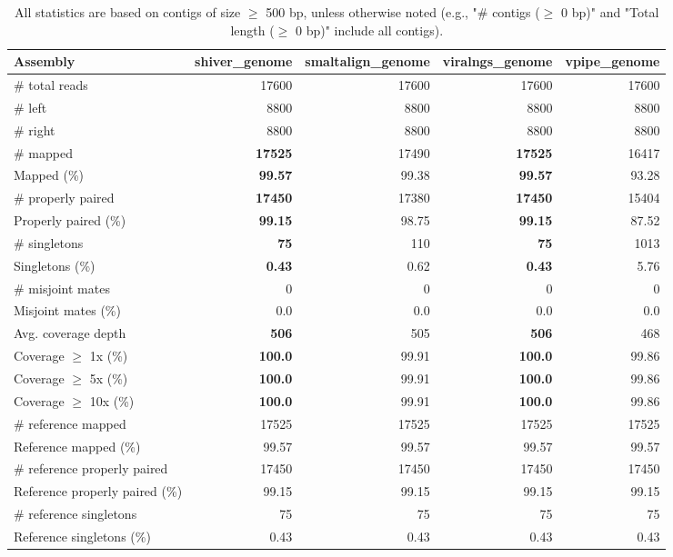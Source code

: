 \documentclass[12pt,a4paper]{article}
\begin{document}
\begin{table}[ht]
\begin{center}
\caption{All statistics are based on contigs of size $\geq$ 500 bp, unless otherwise noted (e.g., "\# contigs ($\geq$ 0 bp)" and "Total length ($\geq$ 0 bp)" include all contigs).}
\begin{tabular}{|l*{4}{|r}|}
\hline
Assembly & shiver\_genome & smaltalign\_genome & viralngs\_genome & vpipe\_genome \\ \hline
\# total reads & 17600 & 17600 & 17600 & 17600 \\ \hline
\# left & 8800 & 8800 & 8800 & 8800 \\ \hline
\# right & 8800 & 8800 & 8800 & 8800 \\ \hline
\# mapped & {\bf 17525} & 17490 & {\bf 17525} & 16417 \\ \hline
Mapped (\%) & {\bf 99.57} & 99.38 & {\bf 99.57} & 93.28 \\ \hline
\# properly paired & {\bf 17450} & 17380 & {\bf 17450} & 15404 \\ \hline
Properly paired (\%) & {\bf 99.15} & 98.75 & {\bf 99.15} & 87.52 \\ \hline
\# singletons & {\bf 75} & 110 & {\bf 75} & 1013 \\ \hline
Singletons (\%) & {\bf 0.43} & 0.62 & {\bf 0.43} & 5.76 \\ \hline
\# misjoint mates & 0 & 0 & 0 & 0 \\ \hline
Misjoint mates (\%) & 0.0 & 0.0 & 0.0 & 0.0 \\ \hline
Avg. coverage depth & {\bf 506} & 505 & {\bf 506} & 468 \\ \hline
Coverage $\geq$ 1x (\%) & {\bf 100.0} & 99.91 & {\bf 100.0} & 99.86 \\ \hline
Coverage $\geq$ 5x (\%) & {\bf 100.0} & 99.91 & {\bf 100.0} & 99.86 \\ \hline
Coverage $\geq$ 10x (\%) & {\bf 100.0} & 99.91 & {\bf 100.0} & 99.86 \\ \hline
\# reference mapped & 17525 & 17525 & 17525 & 17525 \\ \hline
Reference mapped (\%) & 99.57 & 99.57 & 99.57 & 99.57 \\ \hline
\# reference properly paired & 17450 & 17450 & 17450 & 17450 \\ \hline
Reference properly paired (\%) & 99.15 & 99.15 & 99.15 & 99.15 \\ \hline
\# reference singletons & 75 & 75 & 75 & 75 \\ \hline
Reference singletons (\%) & 0.43 & 0.43 & 0.43 & 0.43 \\ \hline

\end{tabular}
\end{center}
\end{table}
\end{document}
